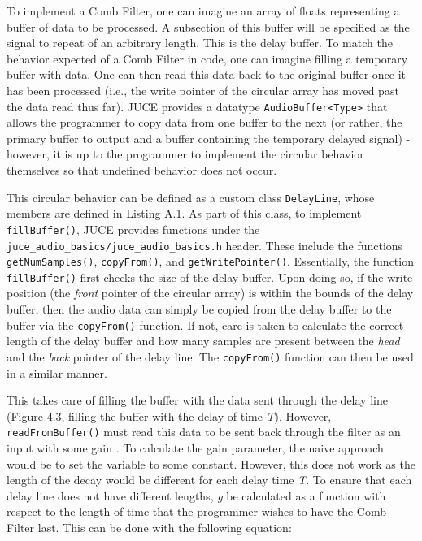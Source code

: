 To implement a Comb Filter, one can imagine an array of floats representing a buffer of data to be processed. A subsection of this buffer will be specified as the signal to repeat of an arbitrary length. This is the delay buffer. To match the behavior expected of a Comb Filter in code, one can imagine filling a temporary buffer with data. One can then read this data back to the original buffer once it has been processed (i.e., the write pointer of the circular array has moved past the data read thus far). JUCE provides a datatype \verb|AudioBuffer<Type>| that allows the programmer to copy data from one buffer to the next (or rather, the primary buffer to output and a buffer containing the temporary delayed signal) - however, it is up to the programmer to implement the circular behavior themselves so that undefined behavior does not occur.
\lstset{language =[ANSI]C++}
\lstset{linewidth=.95\textwidth,breaklines=true}
\lstset{commentstyle=\textit,stringstyle=\upshape,showspaces=false}
\lstset{frame = single}
\lstset{numbers=left,numberstyle=\tiny,basicstyle=\small}
\lstset{commentstyle=\normalfont\itshape,breakautoindent=true}
\lstset{abovecaptionskip=1.2\baselineskip,xleftmargin=30pt}
\lstset{framesep=6pt}
\begin{singlespace}

\end{singlespace} \hfill \break
\hspace*{0.6cm}This circular behavior can be defined as a custom class \verb|DelayLine|, whose members are defined in Listing A.1. As part of this class, to implement \verb|fillBuffer()|, JUCE provides functions under the \verb|juce_audio_basics/juce_audio_basics.h| header. These include the functions \verb|getNumSamples()|, \verb|copyFrom()|, and \verb|getWritePointer()|. Essentially, the function \verb|fillBuffer()| first checks the size of the delay buffer. Upon doing so, if the write position (the \textit{front} pointer of the circular array) is within the bounds of the delay buffer, then the audio data can simply be copied from the delay buffer to the buffer via the \verb|copyFrom()| function. If not, care is taken to calculate the correct length of the delay buffer and how many samples are present between the \textit{head} and the \textit{back} pointer of the delay line. The \verb|copyFrom()| function can then be used in a similar manner.

This takes care of filling the buffer with the data sent through the delay line (Figure 4.3, filling the buffer with the delay of time \textit{T}). However, \verb|readFromBuffer()| must read this data to be sent back through the filter as an input with some gain . To calculate the gain parameter, the naive approach would be to set the variable to some constant. However, this does not work as the length of the decay would be different for each delay time \textit{T}. To ensure that each delay line does not have different lengths, \textit{g} be calculated as a function with respect to the length of time that the programmer wishes to have the Comb Filter last. This can be done with the following equation:

